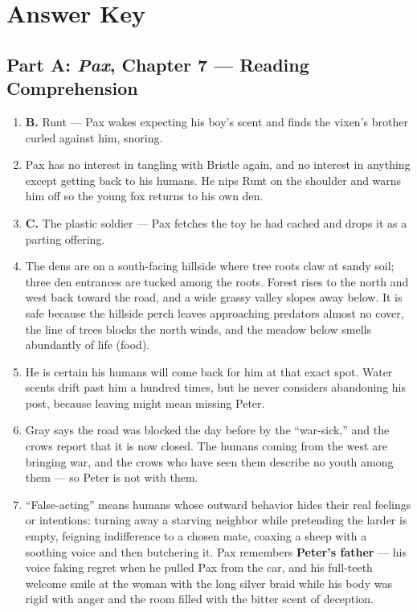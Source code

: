 \documentclass[11pt]{article}
\begin{document}
\section*{Answer Key}

\subsection*{Part A: \textit{Pax}, Chapter 7 --- Reading Comprehension}
\begin{enumerate}
  \item \textbf{B.} Runt --- Pax wakes expecting his boy's scent and finds the vixen's brother curled against him, snoring.
  \item Pax has no interest in tangling with Bristle again, and no interest in anything except getting back to his humans. He nips Runt on the shoulder and warns him off so the young fox returns to his own den.
  \item \textbf{C.} The plastic soldier --- Pax fetches the toy he had cached and drops it as a parting offering.
  \item The dens are on a south-facing hillside where tree roots claw at sandy soil; three den entrances are tucked among the roots. Forest rises to the north and west back toward the road, and a wide grassy valley slopes away below. It is safe because the hillside perch leaves approaching predators almost no cover, the line of trees blocks the north winds, and the meadow below smells abundantly of life (food).
  \item He is certain his humans will come back for him at that exact spot. Water scents drift past him a hundred times, but he never considers abandoning his post, because leaving might mean missing Peter.
  \item Gray says the road was blocked the day before by the ``war-sick,'' and the crows report that it is now closed. The humans coming from the west are bringing war, and the crows who have seen them describe no youth among them --- so Peter is not with them.
  \item ``False-acting'' means humans whose outward behavior hides their real feelings or intentions: turning away a starving neighbor while pretending the larder is empty, feigning indifference to a chosen mate, coaxing a sheep with a soothing voice and then butchering it. Pax remembers \textbf{Peter's father} --- his voice faking regret when he pulled Pax from the car, and his full-teeth welcome smile at the woman with the long silver braid while his body was rigid with anger and the room filled with the bitter scent of deception.

\end{enumerate}
\end{document}
